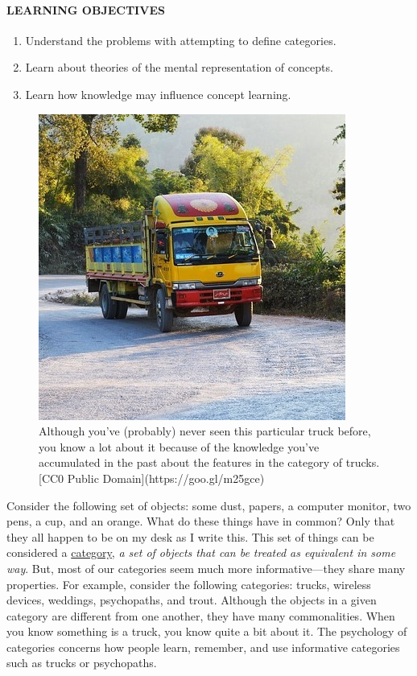 \documentclass[
]{krantz}
\providecommand{\tightlist}{%
  \setlength{\itemsep}{0pt}\setlength{\parskip}{0pt}}
\begin{document}
\paragraph*{LEARNING OBJECTIVES}\label{learning-objectives-6}

\begin{enumerate}
\def\labelenumi{\arabic{enumi}.}
\tightlist
\item
  Understand the problems with attempting to define categories.
\item
  Learn about theories of the mental representation of concepts.
\item
  Learn how knowledge may influence concept learning.
\end{enumerate}

\begin{figure}

{\centering \includegraphics[width=0.5\linewidth]{images/ch7/truck} 

}

\caption{Although you’ve (probably) never seen this particular truck before, you know a lot about it because of the knowledge you’ve accumulated in the past about the features in the category of trucks. [CC0 Public Domain](https://goo.gl/m25gce)}\label{fig:truck}
\end{figure}

Consider the following set of objects: some dust, papers, a computer monitor, two pens, a cup, and an orange. What do these things have in common? Only that they all happen to be on my desk as I write this. This set of things can be considered a \hyperref[category]{category}, \emph{a set of objects that can be treated as equivalent in some way}. But, most of our categories seem much more informative---they share many properties. For example, consider the following categories: trucks, wireless devices, weddings, psychopaths, and trout. Although the objects in a given category are different from one another, they have many commonalities. When you know something is a truck, you know quite a bit about it. The psychology of categories concerns how people learn, remember, and use informative categories such as trucks or psychopaths.
\end{document}
